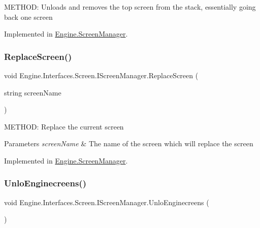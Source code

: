 M\+E\+T\+H\+OD\+: Unloads and removes the top screen from the stack, essentially going back one screen 



Implemented in \hyperlink{a00538_ab553bead481adc65547a323af9dab2d5}{Engine.\+Screen\+Manager}.

\mbox{\label{a00470_aaa6bfa9a986729ada7dcea6ac40f078d}} 
\subsubsection{\texorpdfstring{Replace\+Screen()}{ReplaceScreen()}}
{\footnotesize\ttfamily void Engine.\+Interfaces.\+Screen.\+I\+Screen\+Manager.\+Replace\+Screen (\begin{DoxyParamCaption}\item[{string}]{screen\+Name }\end{DoxyParamCaption})}



M\+E\+T\+H\+OD\+: Replace the current screen 


\begin{DoxyParams}{Parameters}
{\em screen\+Name} & The name of the screen which will replace the screen\\
\hline
\end{DoxyParams}


Implemented in \hyperlink{a00538_a28af5b838f4345834dc2351e06c3d654}{Engine.\+Screen\+Manager}.

\mbox{\label{a00470_a8d30874c7b1b2728a784de0c6e6f80e3}} 
\subsubsection{\texorpdfstring{Unlo\+Enginecreens()}{UnloEnginecreens()}}
{\footnotesize\ttfamily void Engine.\+Interfaces.\+Screen.\+I\+Screen\+Manager.\+Unlo\+Enginecreens (\begin{DoxyParamCaption}{ }\end{DoxyParamCaption})}



